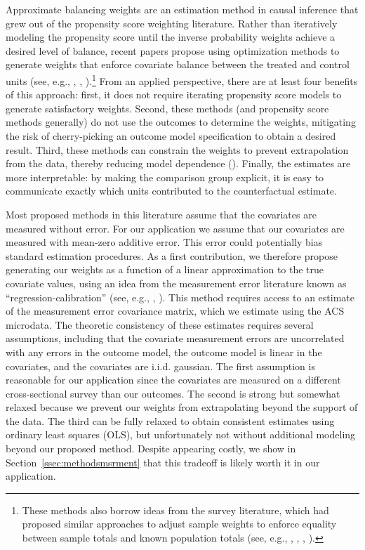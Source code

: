 \documentclass[aoas]{imsart}
\theoremstyle{plain}
\theoremstyle{remark}
\begin{document}
Approximate balancing weights are an estimation method in causal inference that grew out of the propensity score weighting literature. Rather than iteratively modeling the propensity score until the inverse probability weights achieve a desired level of balance, recent papers propose using optimization methods to generate weights that enforce covariate balance between the treated and control units (see, e.g., \cite{hainmueller2012entropy}, \cite{imai2014covariate}, \cite{zubizarreta2015stable}).\footnote{These methods also borrow ideas from the survey literature, which had proposed similar approaches to adjust sample weights to enforce equality between sample totals and known population totals (see, e.g., \cite{haberman1984adjustment}, \cite{deville1992calibration}, \cite{deville1993generalized}, \cite{sarndal2005estimation}).} From an applied perspective, there are at least four benefits of this approach: first, it does not require iterating propensity score models to generate satisfactory weights. Second, these methods (and propensity score methods generally) do not use the outcomes to determine the weights, mitigating the risk of cherry-picking an outcome model specification to obtain a desired result. Third, these methods can constrain the weights to prevent extrapolation from the data, thereby reducing model dependence (\cite{zubizarreta2015stable}). Finally, the estimates are more interpretable: by making the comparison group explicit, it is easy to communicate exactly which units contributed to the counterfactual estimate.

Most proposed methods in this literature assume that the covariates are measured without error. For our application we assume that our covariates are measured with mean-zero additive error. This error could potentially bias standard estimation procedures. As a first contribution, we therefore propose generating our weights as a function of a linear approximation to the true covariate values, using an idea from the measurement error literature known as ``regression-calibration'' (see, e.g., \cite{carroll2006measurement}, \cite{gleser1992importance}). This method requires access to an estimate of the measurement error covariance matrix, which we estimate using the ACS microdata. The theoretic consistency of these estimates requires several assumptions, including that the covariate measurement errors are uncorrelated with any errors in the outcome model, the outcome model is linear in the covariates, and the covariates are i.i.d. gaussian. The first assumption is reasonable for our application since the covariates are measured on a different cross-sectional survey than our outcomes. The second is strong but somewhat relaxed because we prevent our weights from extrapolating beyond the support of the data. The third can be fully relaxed to obtain consistent estimates using ordinary least squares (OLS), but unfortunately not without additional modeling beyond our proposed method. Despite appearing costly, we show in Section~\ref{ssec:methodsmsrment} that this tradeoff is likely worth it in our application.
\end{document}
